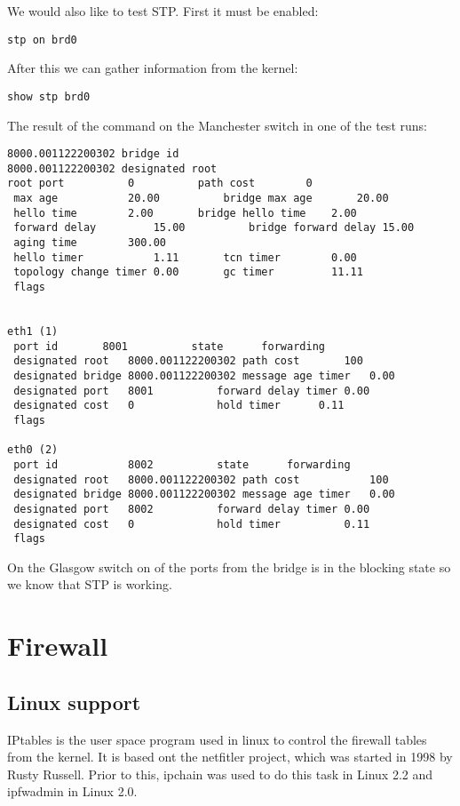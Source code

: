 We would also like to test STP. First it must be enabled:
\begin{lstlisting}
stp on brd0
\end{lstlisting}
After this we can gather information from the kernel:
\begin{lstlisting}
show stp brd0
\end{lstlisting}
The result of the command on the Manchester switch in one of the test runs:
\begin{lstlisting}
8000.001122200302 bridge id		
8000.001122200302 designated root	
root port	       0		  path cost	       0
 max age	       20.00		  bridge max age       20.00
 hello time	       2.00		  bridge hello time    2.00
 forward delay	       15.00	  	  bridge forward delay 15.00
 aging time	       300.00
 hello timer	       1.11		  tcn timer	       0.00
 topology change timer 0.00		  gc timer	       11.11
 flags			


eth1 (1)
 port id	   8001		     state      forwarding
 designated root   8000.001122200302 path cost		 100
 designated bridge 8000.001122200302 message age timer	 0.00
 designated port   8001		     forward delay timer 0.00
 designated cost   0		     hold timer		 0.11
 flags			

eth0 (2)
 port id           8002		     state      forwarding
 designated root   8000.001122200302 path cost           100
 designated bridge 8000.001122200302 message age timer   0.00
 designated port   8002		     forward delay timer 0.00
 designated cost   0		     hold timer	         0.11
 flags			
\end{lstlisting}
On the Glasgow switch on of the ports from the bridge is in the blocking state
so we know that STP is working.

\section{Firewall}
\label{sub-sec:firewall-impl}

\subsection{Linux support}
\label{sub-sec:firewall-lin}

IPtables is the user space program used in linux to control the firewall tables from the kernel. It is based
ont the netfitler project, which was started in 1998 by Rusty Russell. Prior to this, ipchain was used to do
this task in Linux 2.2 and ipfwadmin in Linux 2.0.

